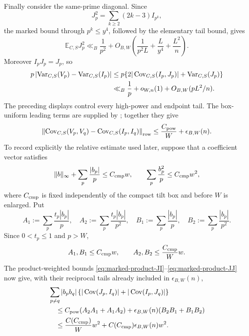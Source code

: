 \documentclass[11pt]{article}
\numberwithin{equation}{section}
\theoremstyle{definition}
\theoremstyle{remark}
\newcommand{\1}{\mathbf 1}
\begin{document}
Finally consider the same-prime diagonal.  Since
\[
 J_p^2=\sum_{k\ge2}(2k-3)I_{p^k},
\]
the marked bound through \(p^k\le y^4\), followed by the elementary
tail bound, gives
\begin{equation}
 {\mathbb E}_{C,S}J_p^2
 \ll_B\frac1{p^2}
 +O_{B,W}\!\left(\frac1{p^2L}+\frac{L}{y^4}+\frac{L^2}{n}\right).
 \label{eq:marked-power-diagonal-moment}
\end{equation}
Moreover \(I_pJ_p=J_p\), so
\begin{align}
 p\left|\operatorname{Var}_{C,S}(V_p)
             -\operatorname{Var}_{C,S}(I_p)\right|
 &\le p\{2|\operatorname{Cov}_{C,S}(I_p,J_p)|
                    +\operatorname{Var}_{C,S}(J_p)\}\notag\\
 &\ll_B\frac1p+o_{W,n}(1)+O_{B,W}(pL^2/n).
 \label{eq:marked-power-row-diagonal}
\end{align}
The preceding displays control every high-power and endpoint tail.  The
box-uniform leading terms are supplied by
; together they give
\begin{equation}
 \left\|\operatorname{Cov}_{C,S}(V_p,V_q)
       -\operatorname{Cov}_{C,S}(I_p,I_q)\right\|_{\rm row}
 \le \frac{C_{\rm pow}}W+\epsilon_{B,W}(n).
 \label{eq:marked-prime-power-aggregate}
\end{equation}
To record explicitly the relative estimate used later, suppose that a
coefficient vector satisfies
\begin{equation}
 \|b\|_\infty+\sum_p\frac{|b_p|}{p}\le C_{\rm cmp}w,\qquad
                  \sum_p\frac{b_p^2}{p}\le C_{\rm cmp}w^2,
 \label{eq:marked-compensated-coefficient-norms}
\end{equation}
where \(C_{\rm cmp}\) is fixed independently of the compact tilt box and
before \(W\) is enlarged.  Put
\[
 A_1:=\sum_p\frac{t_p|b_p|}{p},\quad
 A_2:=\sum_p\frac{t_p|b_p|}{p^2},\quad
 B_1:=\sum_p\frac{|b_p|}{p},\quad
 B_2:=\sum_p\frac{|b_p|}{p^2}.
\]
Since \(0<t_p\le1\) and \(p>W\),
\begin{equation}
 A_1,B_1\le C_{\rm cmp}w,\qquad
 A_2,B_2\le \frac{C_{\rm cmp}}Ww.
 \label{eq:marked-compensated-product-norm-ledger}
\end{equation}
The product-weighted bounds
\eqref{eq:marked-product-JI}--\eqref{eq:marked-product-JJ} now give,
with their reciprocal tails already included in
\(\epsilon_{B,W}(n)\),
\begin{align}
 &\sum_{p\ne q}|b_pb_q|
 \left\{|\operatorname{Cov}(J_p,I_q)|
             +|\operatorname{Cov}(I_p,J_q)|\right\}\notag\\
 &\quad\le C_{\rm pow}(A_2A_1+A_1A_2)
       +\epsilon_{B,W}(n)(B_2B_1+B_1B_2)\notag\\
 &\quad\le \frac{C(C_{\rm cmp})}{W}w^2
       +C(C_{\rm cmp})\epsilon_{B,W}(n)w^2.
 \label{eq:marked-compensated-JI-IJ}
\end{align}
\end{document}
